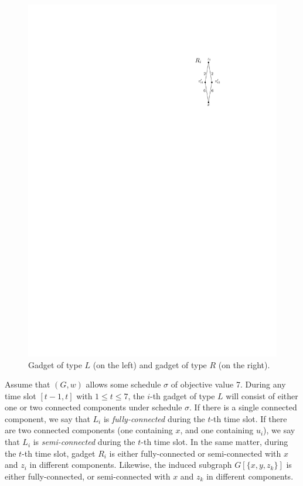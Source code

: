 \documentclass[runningheads]{llncs}
\newcommand{\set}[1]{\{ #1 \}}
\begin{document}
\begin{figure}[htpb]
 \includegraphics[scale=1.1]{img/act-hamilton-cycle-c}
\caption{Gadget of type $L$ (on the left) and gadget of type $R$ (on the right).}
\label{fig:act-hamilton-cycle}
\end{figure}
Assume that $(G, w)$ allows some schedule $\sigma$ of objective value 7. 
During any time slot $[t-1,t]$ with $1\le t\le7$, the $i$-th gadget of type $L$ will 
consist of either one or two connected components under schedule $\sigma$. 
If there is a single connected component, we say that $L_i$ is \emph{fully-connected} during the $t$-th time slot. If there are two connected components (one containing  $x$, and one containing $u_i$), we say that $L_i$ is \emph{semi-connected} during the $t$-th time slot. In the same matter, during the $t$-th time slot, gadget $R_i$ is either fully-connected or semi-connected with $x$ and $z_i$ in different components. Likewise, the induced subgraph $G[\set{x, y, z_k}]$ is either fully-connected, or semi-connected with $x$ and $z_k$ in different components.
\end{document}
